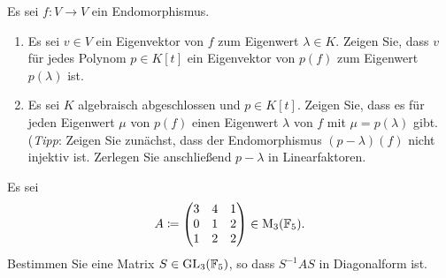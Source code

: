 \documentclass[a4paper, 10pt]{scrartcl}
\begin{document}
\begin{question}
  Es sei $f \colon V \to V$ ein Endomorphismus.
  \begin{enumerate}
    \item
      Es sei $v \in V$ ein Eigenvektor von $f$ zum Eigenwert $\lambda \in K$.
      Zeigen Sie, dass $v$ für jedes Polynom $p \in K[t]$ ein Eigenvektor von $p(f)$ zum Eigenwert $p(\lambda)$ ist.
    \item
      Es sei $K$ algebraisch abgeschlossen und $p \in K[t]$.
      Zeigen Sie, dass es für jeden Eigenwert $\mu$ von $p(f)$ einen Eigenwert $\lambda$ von $f$ mit $\mu = p(\lambda)$ gibt.
      \\
      (\emph{Tipp}:
       Zeigen Sie zunächst, dass der Endomorphismus $(p - \lambda)(f)$ nicht injektiv ist.
       Zerlegen Sie anschließend $p - \lambda$ in Linearfaktoren.
  \end{enumerate}
\end{question}





\begin{question}[subtitle = Diagonalisieren über $\Field_5$]
  Es sei
  \[
              A
    \coloneqq \begin{pmatrix}
                3 & 4 & 1 \\
                0 & 1 & 2 \\
                1 & 2 & 2
              \end{pmatrix}
    \in       \operatorname{M}_{3}(\mathbb{F}_5).
  \]
  Bestimmen Sie eine Matrix $S \in \operatorname{GL}_{3}(\mathbb{F}_5)$, so dass $S^{-1} A S$ in Diagonalform ist.
\end{question}
\end{document}
